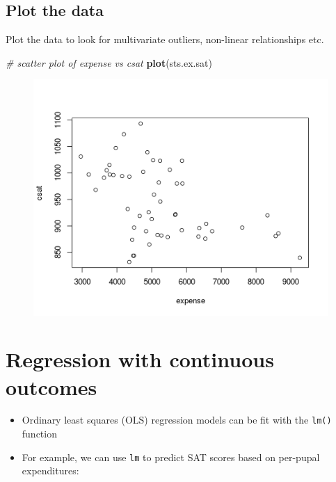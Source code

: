 \documentclass[]{book}
\newenvironment{Shaded}{\begin{snugshade}}{\end{snugshade}}
\newcommand{\KeywordTok}[1]{\textcolor[rgb]{0.13,0.29,0.53}{\textbf{#1}}}
\newcommand{\CommentTok}[1]{\textcolor[rgb]{0.56,0.35,0.01}{\textit{#1}}}
\newcommand{\NormalTok}[1]{#1}
\providecommand{\tightlist}{%
  \setlength{\itemsep}{0pt}\setlength{\parskip}{0pt}}
\begin{document}
\subsection{Plot the data}\label{plot-the-data}

Plot the data to look for multivariate outliers, non-linear
relationships etc.

\begin{Shaded}
\begin{Highlighting}[]
  \CommentTok{# scatter plot of expense vs csat}
  \KeywordTok{plot}\NormalTok{(sts.ex.sat)}
\end{Highlighting}
\end{Shaded}

\begin{figure}
\centering
\includegraphics{R/Rmodels/images/statesCorr1.png}
\caption{}
\end{figure}

\section{Regression with continuous
outcomes}\label{regression-with-continuous-outcomes}

\begin{itemize}
\tightlist
\item
  Ordinary least squares (OLS) regression models can be fit with the
  \texttt{lm()} function
\item
  For example, we can use \texttt{lm} to predict SAT scores based on
  per-pupal expenditures:
\end{itemize}
\end{document}
